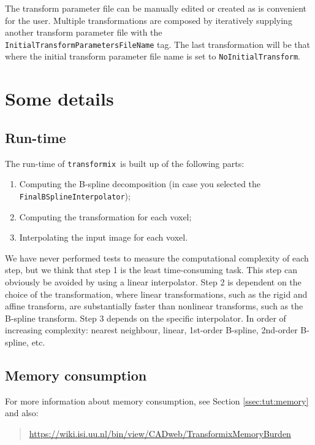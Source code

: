 \documentclass[]{report}
\newcommand{\transformix}{\texttt{transformix}}
\begin{document}
The transform parameter file can be manually edited or created as is
convenient for the user. Multiple transformations are composed by
iteratively supplying another transform parameter file with the
\texttt{InitialTransformParametersFileName} tag. The last
transformation will be that where the initial transform parameter
file name is set to \texttt{NoInitialTransform}.

\section{Some details}

\subsection{Run-time}

The run-time of \transformix\ is built up of the following parts:

\begin{enumerate}
\item Computing the B-spline decomposition (in case you selected the
\texttt{FinalBSplineInterpolator});

\item Computing the transformation for each voxel;

\item Interpolating the input image for each voxel.
\end{enumerate}
We have never performed tests to measure the computational complexity
of each step, but we think that step 1 is the least time-consuming
task. This step can obviously be avoided by using a linear
interpolator. Step 2 is dependent on the choice of the
transformation, where linear transformations, such as the rigid and
affine transform, are substantially faster than nonlinear transforms,
such as the B-spline transform. Step 3 depends on the specific
interpolator. In order of increasing complexity: nearest neighbour,
linear, 1st-order B-spline, 2nd-order B-spline, etc.


\subsection{Memory consumption}

For more information about memory consumption, see Section
\ref{ssec:tut:memory} and also:
\begin{quote}
\url{https://wiki.isi.uu.nl/bin/view/CADweb/TransformixMemoryBurden}
\end{quote}
\end{document}
